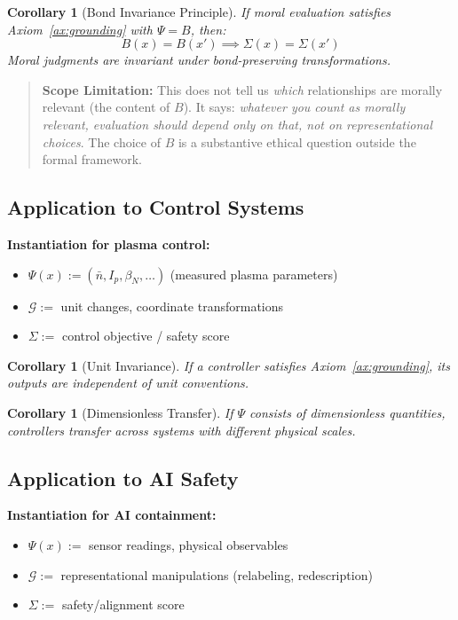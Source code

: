 \documentclass[12pt]{article}
\newtheorem{corollary}[theorem]{Corollary}
\theoremstyle{definition}
\theoremstyle{remark}
\newcommand{\calG}{\mathcal{G}}
\begin{document}
\begin{corollary}[Bond Invariance Principle]\label{cor:bip}
If moral evaluation satisfies Axiom~\ref{ax:grounding} with $\Psi = B$,
then:
\[
    B(x) = B(x') \implies \Sigma(x) = \Sigma(x')
\]
Moral judgments are invariant under bond-preserving transformations.
\end{corollary}

\begin{quote}
\textbf{Scope Limitation:} This does not tell us \emph{which} relationships are morally relevant (the
content of $B$). It says: \emph{whatever you count as morally relevant, evaluation should depend
only on that, not on representational choices}. The choice of $B$ is a substantive ethical
question outside the formal framework.
\end{quote}

\subsection{Application to Control Systems}

\textbf{Instantiation for plasma control:}
\begin{itemize}
    \item $\Psi(x) := (\bar{n}, I_p, \beta_N, \ldots)$ (measured plasma parameters)
    \item $\calG :=$ unit changes, coordinate transformations
    \item $\Sigma :=$ control objective / safety score
\end{itemize}

\begin{corollary}[Unit Invariance]\label{cor:unit-inv}
If a controller satisfies Axiom~\ref{ax:grounding}, its outputs are independent
of unit conventions.
\end{corollary}

\begin{corollary}[Dimensionless Transfer]\label{cor:dimless}
If $\Psi$ consists of dimensionless quantities, controllers
transfer across systems with different physical scales.
\end{corollary}

\subsection{Application to AI Safety}

\textbf{Instantiation for AI containment:}
\begin{itemize}
    \item $\Psi(x) :=$ sensor readings, physical observables
    \item $\calG :=$ representational manipulations (relabeling, redescription)
    \item $\Sigma :=$ safety/alignment score
\end{itemize}
\end{document}
